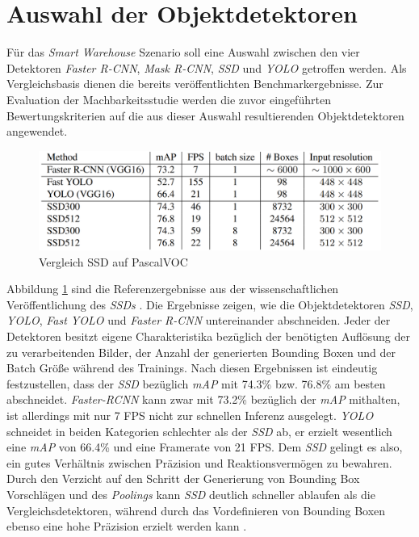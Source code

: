 \section{Auswahl der Objektdetektoren}

Für das \textit{Smart Warehouse} Szenario soll eine Auswahl zwischen den vier Detektoren \textit{Faster R-CNN}, \textit{Mask R-CNN}, \textit{SSD} und \textit{YOLO} getroffen werden. Als Vergleichsbasis dienen die bereits veröffentlichten Benchmarkergebnisse. Zur Evaluation der Machbarkeitsstudie werden die zuvor eingeführten Bewertungskriterien auf die aus dieser Auswahl resultierenden Objektdetektoren angewendet.

\begin{figure}[ht]
	\begin{center}
		\includegraphics[width=12cm]{Bilder/ssd_results.png} 
		\caption[Vergleich SSD auf PascalVOC]{Vergleich SSD auf PascalVOC \cite{ssd.20161229}}
		\label{result}
	\end{center}
\end{figure}

Abbildung \ref{result} sind die Referenzergebnisse aus der wissenschaftlichen Veröffentlichung des \textit{SSDs} \cite{ssd.20161229}. Die Ergebnisse zeigen, wie die Objektdetektoren \textit{SSD}, \textit{YOLO}, \textit{Fast YOLO} und \textit{Faster R-CNN} untereinander abschneiden. Jeder der Detektoren besitzt eigene Charakteristika bezüglich der benötigten Auflösung der zu verarbeitenden Bilder, der Anzahl der generierten Bounding Boxen und der Batch Größe während des Trainings. Nach diesen Ergebnissen ist eindeutig festzustellen, dass der \textit{SSD} bezüglich \textit{mAP} mit 74.3\% bzw. 76.8\% am besten abschneidet. \textit{Faster-RCNN} kann zwar mit 73.2\% bezüglich der \textit{mAP} mithalten, ist allerdings mit nur 7 FPS nicht zur schnellen Inferenz ausgelegt. \textit{YOLO} schneidet in beiden Kategorien schlechter als der \textit{SSD} ab, er erzielt wesentlich eine \textit{mAP} von 66.4\% und eine Framerate von 21 FPS. Dem \textit{SSD} gelingt es also, ein gutes Verhältnis zwischen Präzision und Reaktionsvermögen zu bewahren. Durch den Verzicht auf den Schritt der Generierung von Bounding Box Vorschlägen und des \textit{Poolings} kann \textit{SSD} deutlich schneller ablaufen als die Vergleichsdetektoren, während durch das Vordefinieren von Bounding Boxen ebenso eine hohe Präzision erzielt werden kann \cite{ssd.20161229}.

